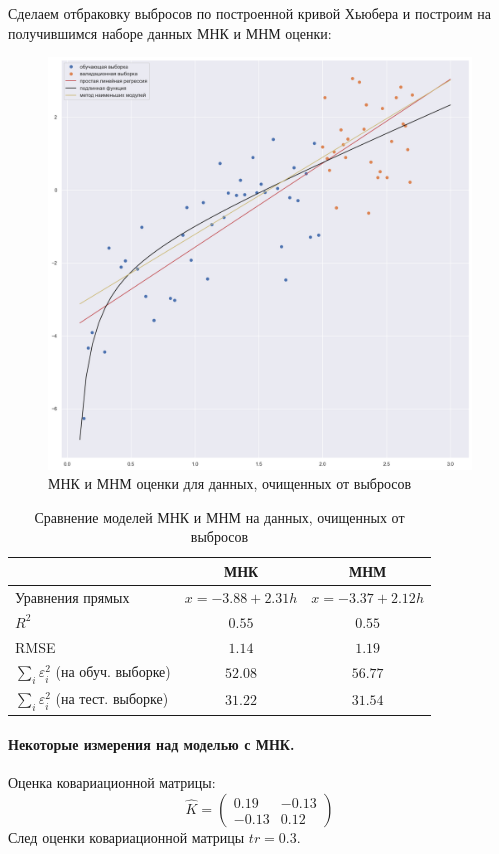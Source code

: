\documentclass[a4paper,12pt]{article}
\begin{document}
Сделаем отбраковку выбросов по построенной кривой Хьюбера и построим на получившимся наборе данных МНК и МНМ оценки:

\begin{figure}[H]
    \centering
    \includegraphics[width=0.5\linewidth]{src/img/данные_без_выбросов.png}
    \caption{МНК и МНМ оценки для данных, очищенных от выбросов}
\end{figure}

\begin{table}[H]
    \centering
    \begin{tabular}{|l|c|c|}
        \hline
        & МНК & МНМ \\ \hline
        Уравнения прямых & $x = -3.88 + 2.31 h$ & $x = -3.37 + 2.12 h$ \\ \hline
        $R^2$ & $0.55$ & $0.55$ \\ \hline
        RMSE & $1.14$ & $1.19$ \\ \hline
        $\sum\limits_i \varepsilon_i^2$ (на обуч. выборке) & $52.08$ & $56.77$ \\ \hline
        $\sum\limits_i \varepsilon_i^2$ (на тест. выборке) & $31.22$ & $31.54$ \\ \hline
    \end{tabular}
    \caption{Сравнение моделей МНК и МНМ на данных, очищенных от выбросов}
\end{table}


\paragraph{Некоторые измерения над моделью с МНК.\\}
Оценка ковариационной матрицы:
$$ \hat{K} = 
\begin{pmatrix}
    0.19 & -0.13\\
    -0.13 & 0.12
\end{pmatrix}
$$
След оценки ковариационной матрицы $tr = 0.3$.
\end{document}
